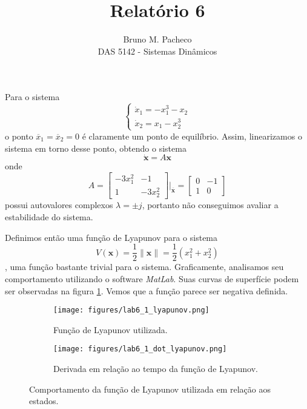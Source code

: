 \documentclass[a4paper]{report}
\begin{document}
\title{Relatório 6}
\author{Bruno M. Pacheco\\
DAS 5142 - Sistemas Dinâmicos}
 
\maketitle


Para o sistema \[
\begin{cases}
    \dot{x}_1 = -x_1^{3} - x_2 \\
    \dot{x}_2 = x_1 - x_2^{3}
\end{cases}
\] o ponto $\overline{x}_1=\overline{x}_2=0$ é claramente um ponto de equilíbrio. Assim, linearizamos o sistema em torno desse ponto, obtendo o sistema \[
\bm{\dot{x}} = A\bm{x}
\] onde \[
A = \begin{bmatrix} -3x_1^2 & -1 \\ 1 & -3x_2^2 \end{bmatrix} \bigr|_{\overline{\bm{x}}} = \begin{bmatrix} 0 & -1 \\ 1 & 0 \end{bmatrix} 
\] possui autovalores complexos $\lambda = \pm j$, portanto não conseguimos avaliar a estabilidade do sistema.

Definimos então uma função de Lyapunov para o sistema \[
    V(\bm{x}) = \frac{1}{2}\|\bm{x}\| = \frac{1}{2}\left( x_1^2 + x_2^2 \right) 
    \], uma função bastante trivial para o sistema. Graficamente, analisamos seu comportamento utilizando o software \emph{MatLab}. Suas curvas de superfície podem ser observadas na figura \ref{fig:figures-lab4_1_resposta_simulink}. Vemos que a função parece ser negativa definida.

\begin{figure}[H]
    \centering
    \begin{subfigure}{0.45\textwidth}
	\texttt{[image: figures/lab6\_1\_lyapunov.png]}
	\caption{Função de Lyapunov utilizada.}
    \end{subfigure}
    \begin{subfigure}{0.45\textwidth}
	\texttt{[image: figures/lab6\_1\_dot\_lyapunov.png]}
	\caption{Derivada em relação ao tempo da função de Lyapunov.}
    \end{subfigure}
    \caption{Comportamento da função de Lyapunov utilizada em relação aos estados.}
    \label{fig:figures-lab4_1_resposta_simulink}
\end{figure}
\end{document}
